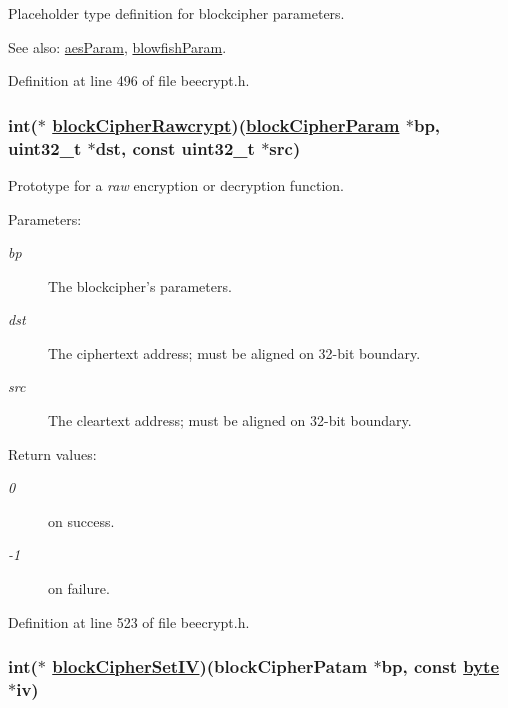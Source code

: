 Placeholder type definition for blockcipher parameters. 

\begin{Desc}
\item[See also:]\hyperlink{structaesParam}{aes\-Param}, \hyperlink{structblowfishParam}{blowfish\-Param}. \end{Desc}
Definition at line 496 of file beecrypt.h.\hypertarget{group__BC__m_ga3}{
\subsubsection[blockCipherRawcrypt]{\setlength{\rightskip}{0pt plus 5cm}int($\ast$ \hyperlink{group__BC__m_ga3}{block\-Cipher\-Rawcrypt})(\hyperlink{group__BC__m_ga1}{block\-Cipher\-Param} $\ast$bp, uint32\_\-t $\ast$dst, const uint32\_\-t $\ast$src)}}
\label{group__BC__m_ga3}


Prototype for a {\em raw\/} encryption or decryption function. 

\begin{Desc}
\item[Parameters:]
\begin{description}
\item[{\em bp}]The blockcipher's parameters. \item[{\em dst}]The ciphertext address; must be aligned on 32-bit boundary. \item[{\em src}]The cleartext address; must be aligned on 32-bit boundary. \end{description}
\end{Desc}
\begin{Desc}
\item[Return values:]
\begin{description}
\item[{\em 0}]on success. \item[{\em -1}]on failure. \end{description}
\end{Desc}
Definition at line 523 of file beecrypt.h.\hypertarget{group__BC__m_ga2}{
\subsubsection[blockCipherSetIV]{\setlength{\rightskip}{0pt plus 5cm}int($\ast$ \hyperlink{group__BC__m_ga2}{block\-Cipher\-Set\-IV})(block\-Cipher\-Patam $\ast$bp, const \hyperlink{beecrypt_8api_8h_a3}{byte} $\ast$iv)}}
\label{group__BC__m_ga2}


